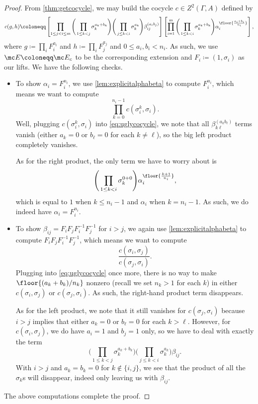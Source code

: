 \documentclass{article}
\numberwithin{equation}{section}
\begin{document}
\begin{proof}
	From \autoref{thm:getcocycle}, we may build the cocycle $c\in Z^2(\Gamma,A)$ defined by
	\begin{equation}
		c(g,h)\coloneqq\left[\prod_{1\le j<i\le m}\Bigg(\prod_{1\le k<j}\sigma_k^{a_k+b_k}\Bigg)\Bigg(\prod_{j\le k<i}\sigma_k^{a_k}\Bigg)\beta_{ij}^{(a_ib_j)}\right]\left[\prod_{i=1}^m\Bigg(\prod_{1\le k<i}\sigma_k^{a_k+b_k}\Bigg)\alpha_i^{\floor{\frac{a_i+b_i}{n_i}}}\right], \label{eq:uglycocycle}
	\end{equation}
	where $g\coloneqq\prod_iF_i^{a_i}$ and $h\coloneqq\prod_iF_j^{a_j}$ and $0\le a_i,b_i<n_i$. As such, we use $\mc E\coloneqq\mc E_c$ to be the corresponding extension and $F_i\coloneqq(1,\sigma_i)$ as our lifts. We have the following checks.
	\begin{itemize}
		\item To show $\alpha_i=F_i^{n_i}$, we use \autoref{lem:explicitalphabeta} to compute $F_i^{n_i}$, which means we want to compute
		\[\prod_{k=0}^{n_i-1}c\left(\sigma_i^k,\sigma_i\right).\]
		Well, plugging $c\left(\sigma_i^k,\sigma_i\right)$ into \autoref{eq:uglycocycle}, we note that all $\beta_{k\ell}^{(a_kb_\ell)}$ terms vanish (either $a_k=0$ or $b_\ell=0$ for each $k\ne\ell$), so the big left product completely vanishes.
		
		As for the right product, the only term we have to worry about is
		\[\Bigg(\prod_{1\le k<i}\sigma_k^{0+0}\Bigg)\alpha_i^{\floor{\frac{k+1}{n_i}}},\]
		which is equal to $1$ when $k\le n_i-1$ and $\alpha_i$ when $k=n_i-1$. As such, we do indeed have $\alpha_i=F_i^{n_i}$.
		\item To show $\beta_{ij}=F_iF_jF_i^{-1}F_j^{-1}$ for $i>j$, we again use \autoref{lem:explicitalphabeta} to compute $F_iF_jF_i^{-1}F_j^{-1}$, which means we want to compute
		\[\frac{c(\sigma_i,\sigma_j)}{c(\sigma_j,\sigma_i)}.\]
		Plugging into \autoref{eq:uglycocycle} once more, there is no way to make $\floor{(a_k+b_k)/n_k}$ nonzero (recall we set $n_k>1$ for each $k$) in either $c(\sigma_i,\sigma_j)$ or $c(\sigma_j,\sigma_i)$. As such, the right-hand product term disappears.

		As for the left product, we note that it still vanishes for $c(\sigma_j,\sigma_i)$ because $i>j$ implies that either $a_k=0$ or $b_\ell=0$ for each $k>\ell$. However, for $c(\sigma_i,\sigma_j)$, we do have $a_i=1$ and $b_j=1$ only, so we have to deal with exactly the term
		\[\Bigg(\prod_{1\le k<j}\sigma_k^{a_k+b_k}\Bigg)\Bigg(\prod_{j\le k<i}\sigma_k^{a_k}\Bigg)\beta_{ij}.\]
		With $i>j$ and $a_k=b_k=0$ for $k\notin\{i,j\}$, we see that the product of all the $\sigma_k$s will disappear, indeed only leaving us with $\beta_{ij}$.
	\end{itemize}
	The above computations complete the proof.
\end{proof}
\end{document}
